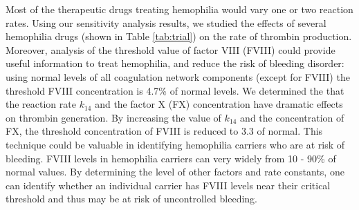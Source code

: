 Most of the therapeutic drugs treating hemophilia would vary one or
two reaction rates. Using our sensitivity analysis results, we
studied the effects of several hemophilia drugs (shown in Table
\ref{tab:trial}) on the rate of thrombin production. Moreover,
analysis of the threshold value of factor VIII (FVIII) could provide
useful information to treat hemophilia, and reduce the risk of
bleeding disorder: using normal levels of all coagulation network
components (except for FVIII) the threshold FVIII concentration is
4.7\% of normal levels. We determined the that the reaction rate
$k_{14}$ and the factor X (FX) concentration have dramatic effects
on thrombin generation. By increasing the value of $k_{14}$ and the
concentration of FX, the threshold concentration of FVIII is reduced
to 3.3 of normal. This technique could be valuable in identifying
hemophilia carriers who are at risk of bleeding. FVIII levels in
hemophilia carriers can very widely from 10 - 90\% of normal values.
By determining the level of other factors and rate constants, one
can identify whether an individual carrier has FVIII levels near
their critical threshold and thus may be at risk of uncontrolled
bleeding.

